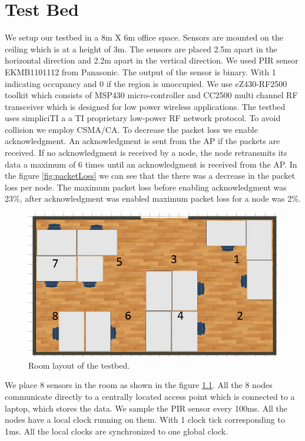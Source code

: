 \chapter{Test Bed}
\label{chp:testbed}

We setup our testbed in a 8m X 6m office space. Sensors are mounted on the ceiling which is at a height of 3m. The sensors are  placed 2.5m apart in the horizontal direction and 2.2m apart in the vertical direction.  We used  PIR sensor EKMB1101112 from Panasonic. 
The output of the sensor is binary. With 1 indicating occupancy and 0 if the region is unoccupied.  We use eZ430-RF2500 toolkit which consists of MSP430 micro-controller  and CC2500 multi channel
RF transceiver which is designed for low power wireless applications. The testbed uses simpliciTI a  a TI proprietary  low-power RF network protocol. To avoid collision we employ CSMA/CA. To decrease
the packet loss we enable acknowledgment. An acknowledgment is sent from the AP if the packets are received. If no acknowledgment is received by a node, the node retransmits its data a maximum of 
6 times until an acknowledgment is  received from the AP. In the figure \ref{fig:packetLoss} we can see that the there was a decrease in the packet loss per node. The maximum packet loss before enabling acknowledgment was 23\%, 
after acknowledgment was enabled maximum packet loss for a node was 2\%.
\begin{figure}
\centering
\includegraphics[scale=0.5]{./pics/roomLayout.png}
\caption{Room layout of the testbed.}
\label{fig:roomLayout}
\end{figure}

We place 8 sensors in the room as shown in the figure \ref{fig:roomLayout}. All the 8 nodes communicate directly to a centrally located access
point which is connected to a laptop, which stores the data. We sample the PIR sensor every 100ms.
All the nodes have a local clock running on them. With 1 clock tick corresponding to 1ms. All the local clocks are synchronized to one global clock.


